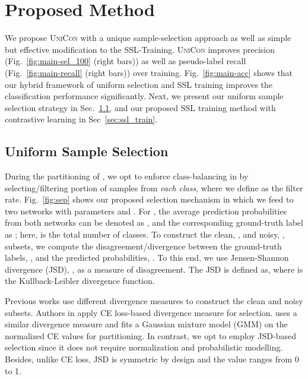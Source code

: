 \documentclass[10pt,twocolumn,letterpaper]{article}
\begin{document}
\section{Proposed Method}
We propose \textsc{UniCon} with a unique sample-selection approach as well as simple but effective modification to the SSL-Training.
\textsc{UniCon} improves precision (Fig.~\ref{fig:main-sel_100} (right bars)) as well as  pseudo-label recall (Fig.~\ref{fig:main-recall} (right bars)) over training. Fig.~\ref{fig:main-acc} shows that our hybrid framework of uniform selection and SSL training improves the classification performance significantly. Next, we present our uniform sample selection strategy in Sec.~\ref{sec:uni_sel}, and our proposed SSL training method with contrastive learning in Sec~\ref{sec:ssl_train}.





\subsection{Uniform Sample Selection}
\label{sec:uni_sel}
During the partitioning of , we opt to enforce class-balancing in  by selecting/filtering  portion of samples from {\it each class}, where we define  as the filter rate. Fig.~\ref{fig:sep} shows our proposed selection mechanism in which we feed  to two networks with parameters  and . For , the average 
prediction probabilities from both networks can be denoted as , and the corresponding ground-truth label as ; here,  is the total number of classes.
To construct the clean, , and noisy, , subsets, we compute the disagreement/divergence between the ground-truth labels, , and the predicted probabilities, . To this end, we use Jensen-Shannon divergence (JSD), , as a measure of disagreement. The JSD is defined as, 
where  is the Kullback-Leibler divergence function.

Previous works use different divergence measures to construct the clean and noisy subsets. Authors in \cite{han2018co, li2020dividemix} apply CE loss-based divergence measure for selection. \cite{li2020dividemix} uses a similar divergence measure and fits a Gaussian mixture model (GMM) on the normalized CE values for partitioning. In contrast, we opt to employ JSD-based selection since it does not require normalization and probabilistic modelling. Besides, unlike CE loss, JSD is symmetric by design and the value ranges from 0 to 1. 
\end{document}
